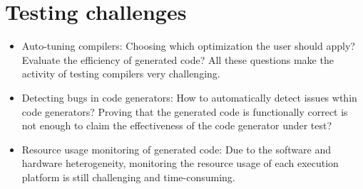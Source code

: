 \section{Testing challenges}

\begin{itemize}
	\item Auto-tuning compilers: Choosing which optimization the user should apply? Evaluate the efficiency of generated code? All these questions make the activity of testing compilers very challenging.
	\item Detecting bugs in code generators: How to automatically detect issues wthin code generators? Proving that the generated code is functionally correct is not enough to claim the effectiveness of the code generator under test?
	\item Resource usage monitoring of generated code: Due to the software and hardware heterogeneity, monitoring the resource usage of each execution platform is still challenging and time-consuming. 
\end{itemize}



